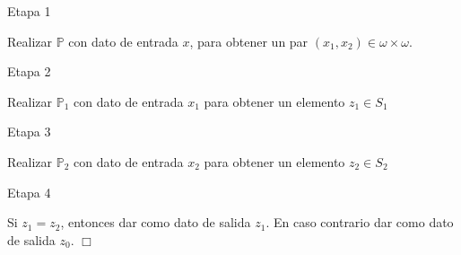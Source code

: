Etapa 1

Realizar \(\mathbb{P}\) con dato de entrada \(x\), para obtener un par \((x_{1},x_{2})\in \omega \times \omega \).

Etapa 2

Realizar \(\mathbb{P}_{1}\) con dato de entrada \(x_{1}\) para obtener un elemento \(z_{1}\in S_{1}\)

Etapa 3

Realizar \(\mathbb{P}_{2}\) con dato de entrada \(x_{2}\) para obtener un elemento \(z_{2}\in S_{2}\)

Etapa 4

Si \(z_{1}=z_{2}\), entonces dar como dato de salida \(z_{1}.\) En caso contrario dar como dato de salida \(z_{0}\). \(\Box\)
